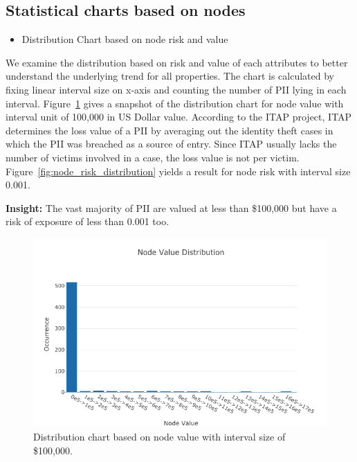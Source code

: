 \documentclass[conference]{IEEEtran}
\begin{document}
\subsection{Statistical charts based on nodes}
\begin{itemize}
\item Distribution Chart based on node risk and value
\end{itemize}

We examine the distribution based on risk and value of each attributes to better understand the underlying trend for all properties. The chart is calculated by fixing linear interval size on x-axis and counting the number of PII lying in each interval. Figure~\ref{fig:node_value_distribution} gives a snapshot of the distribution chart for node value with interval unit of 100,000 in US Dollar value. According to the ITAP project\cite{ITAPDataSource}, ITAP determines the loss value of a PII  by averaging out the identity theft cases in which the PII was breached as a source of entry. Since ITAP usually lacks the number of victims involved in a case, the loss value is not per victim. Figure~\ref{fig:node_risk_distribution} yields a result for node risk with interval size 0.001.

{\bf Insight:} The vast majority of PII are valued at less than \$100,000 but have a risk of exposure of less than 0.001 too.

\begin{figure}[ht!]
  \includegraphics[width=\linewidth]{node_value_distribution.png}
  \caption{Distribution chart based on node value with interval size of \$100,000.}
  \label{fig:node_value_distribution}
\end{figure}
\end{document}
